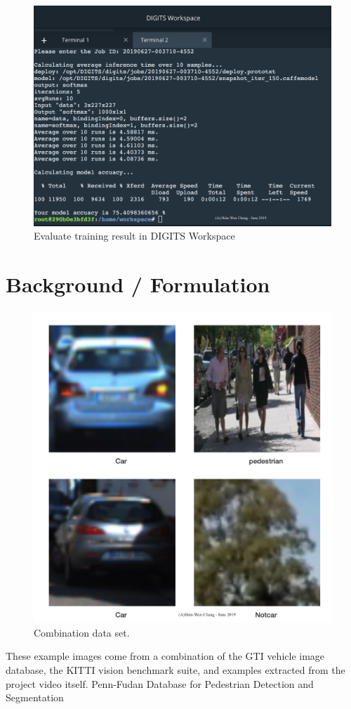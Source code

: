 \documentclass[10pt,journal,compsoc]{IEEEtran}
\begin{document}
\begin{figure}[thpb]
      \centering
      \includegraphics[width=\linewidth]{evaluate.png}
      \caption{Evaluate training result in DIGITS Workspace}
      \label{fig:robot1}
\end{figure}

\section{Background / Formulation}
\begin{figure}[thpb]
      \centering
      \includegraphics[width=\linewidth]{mixDataset.png}
      \caption{Combination data set.}
      \label{fig:robot1}
\end{figure}
These example images come from a combination of the GTI vehicle image database, the KITTI vision benchmark suite, and examples extracted from the project video itself. Penn-Fudan Database for Pedestrian Detection and Segmentation
\end{document}
